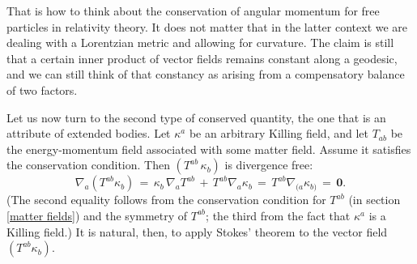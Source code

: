 \documentclass [12] {article}
\theoremstyle{plain}
\numberwithin{figure}{subsection}
\numberwithin{proposition}{subsection}
\begin{document}
That is how to think about the conservation of angular momentum for  free particles in relativity theory.  It does not matter that in the latter context we are dealing with a Lorentzian  metric and allowing for curvature. The claim is still that a certain inner product of  vector fields remains constant along a geodesic, and we can still think of that constancy as arising from a compensatory balance of two factors. 

Let us now turn to the second type of conserved quantity, the one that is an attribute of extended bodies. Let $\kappa^a$ be an arbitrary Killing field, and let $T_{ab}$ be the energy-momentum field associated with some matter field. Assume it satisfies the conservation condition.  Then $(T^{ab} \, \kappa_b)$ is divergence free:
\begin{equation} \label{2nd Killing constancy equation}
\nabla_a (T^{ab}  \kappa_b)  \, = \,  \kappa_b \, \nabla_a T^{ab} \, + \, T^{ab} \nabla_a \kappa_b \, = \, T^{ab} \nabla_{(a} \kappa_{b)} \, = \, \textbf{0}.  
\end{equation}
% 
(The second equality follows from the conservation condition for $T^{ab}$ (in section \ref{matter fields})  and the symmetry of $T^{ab}$; the third from the fact that $\kappa^a$ is a Killing field.)  It is natural, then, to apply Stokes' theorem to the vector field $(T^{ab} \kappa_b)$. 
\end{document}

